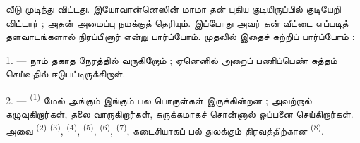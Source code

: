 %
%
%

\VUsaut{6.0mm}
\VUsaut{1.4mm}
\VUsaut{0.4mm}
\VUsaut{2.2mm}

வீடு முடிந்து விட்டது. இயோவான்னெஸின் மாமா தன் புதிய குடியிருப்பில்
குடியேறி விட்டார் ; அதன் அமைப்பு நமக்குத் தெரியும். இப்போது அவர் தன்
வீட்டை எப்படித் தளவாடங்களால் நிரப்பினார் என்று பார்ப்போம். முதலில்
இதைச் சுற்றிப் பார்ப்போம் :

\VUsaut{3.0mm}

1. --- நாம் தகாத நேரத்தில் வருகிறோம் ; ஏனெனில் அறைப் பணிப்பெண்
 சுத்தம் செய்வதில் ஈடுபட்டிருக்கிறாள்.

2. ---  \textsuperscript{(1)} மேல் அங்கும் இங்கும்
பல பொருள்கள் இருக்கின்றன ; அவற்றால் கழுவுகிறார்கள், தலை வாருகிறார்கள்,
சுருக்கமாகச் சொன்னால் ஒப்பனை செய்கிறார்கள். அவை 
\textsuperscript{(2)}  \textsuperscript{(3)},
 \textsuperscript{(4)}, 
\textsuperscript{(5)},  \textsuperscript{(6)},
 \textsuperscript{(7)}, கடைசியாகப் பல் துலக்கும்
திரவத்திற்கான  \textsuperscript{(8)}.

